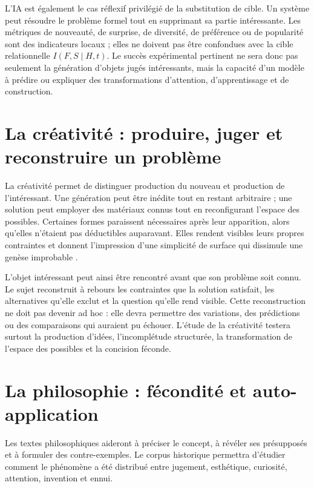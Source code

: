 \documentclass[11pt,a4paper]{article}
\begin{document}
L'IA est également le cas réflexif privilégié de la substitution de cible. Un
système peut résoudre le problème formel tout en supprimant sa
partie intéressante. Les métriques de nouveauté, de surprise, de diversité, de
préférence ou de popularité sont des indicateurs locaux ; elles ne
doivent pas être confondues avec la cible relationnelle
\(I(F,S\mid H,t)\). Le succès expérimental pertinent ne sera donc pas seulement
la génération d'objets jugés intéressants, mais la capacité d'un modèle à
prédire ou expliquer des transformations d'attention, d'apprentissage et de
construction.

\section{La créativité : produire, juger et reconstruire un problème}

La créativité permet de distinguer production du nouveau et production de
l'intéressant. Une génération peut être inédite tout en restant arbitraire ;
une solution peut employer des matériaux connus tout en reconfigurant l'espace
des possibles. Certaines formes paraissent nécessaires après leur apparition,
alors qu'elles n'étaient pas déductibles auparavant. Elles rendent visibles
leurs propres contraintes et donnent l'impression d'une simplicité de surface
qui dissimule une genèse improbable
\parencite{pachet2026impossibilite,pachet2027virtuosite}.

L'objet intéressant peut ainsi être rencontré avant que son problème soit
connu. Le sujet reconstruit à rebours les contraintes que la solution satisfait,
les alternatives qu'elle exclut et la question qu'elle rend visible. Cette
reconstruction ne doit pas devenir ad hoc : elle devra permettre des variations,
des prédictions ou des comparaisons qui auraient pu échouer. L'étude de la
créativité testera surtout la production d'idées, l'incomplétude structurée, la
transformation de l'espace des possibles et la concision féconde.

\section{La philosophie : fécondité et auto-application}

Les textes philosophiques aideront à préciser le concept, à révéler ses
présupposés et à formuler des contre-exemples. Le corpus historique permettra
d'étudier comment le phénomène a
été distribué entre jugement, esthétique, curiosité, attention, invention et
ennui.
\end{document}
